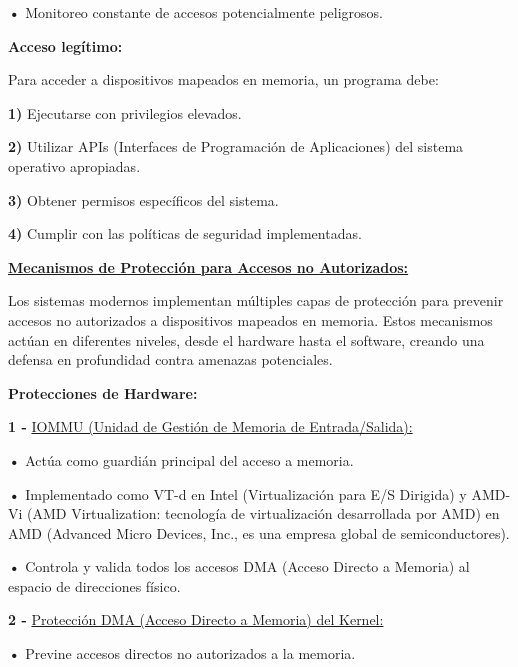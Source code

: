 \documentclass{article}
\begin{document}
\textbf{    •} { Monitoreo constante de accesos potencialmente peligrosos.}


\quad

\textbf{Acceso legítimo: }

\quad

{Para acceder a dispositivos mapeados en memoria, un programa debe:}

\quad

\textbf{1)  } {Ejecutarse con privilegios elevados.}

\textbf{2)  } {Utilizar APIs (Interfaces de Programación de Aplicaciones) del sistema operativo apropiadas.}

\textbf{3)  } {Obtener permisos específicos del sistema.}

\textbf{4)  } {Cumplir con las políticas de seguridad implementadas.}


\quad

\textbf{\underline{Mecanismos de Protección para Accesos no Autorizados: }}

\quad

 {Los sistemas modernos implementan múltiples capas de protección para prevenir accesos no autorizados a dispositivos mapeados en memoria. Estos mecanismos actúan en diferentes niveles, desde el hardware hasta el software, creando una defensa en profundidad contra amenazas potenciales.}



\quad

\textbf{Protecciones de Hardware: }

\quad

\textbf{1 -  } {\underline{IOMMU (Unidad de Gestión de Memoria de Entrada/Salida): }}

\quad

\textbf{    •} { Actúa como guardián principal del acceso a memoria.}

\textbf{    •} { Implementado como VT-d en Intel (Virtualización para E/S Dirigida) y AMD-Vi (AMD Virtualization: tecnología de virtualización desarrollada por AMD) en AMD (Advanced Micro Devices, Inc., es una empresa global de semiconductores).}

\textbf{    •} { Controla y valida todos los accesos DMA (Acceso Directo a Memoria) al espacio de direcciones físico.}


\quad

\textbf{2 -  } {\underline{Protección DMA  (Acceso Directo a Memoria) del Kernel: }}

\quad

\textbf{    •} { Previne accesos directos no autorizados a la memoria.}
\end{document}
